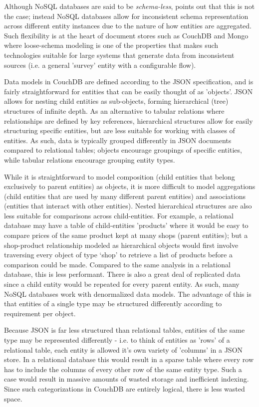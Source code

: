 Although NoSQL databases are said to be \textit{schema-less}, \cite{ATZENI2016} points out that this is not the case; instead NoSQL databases allow for inconsistent schema representation across different entity instances due to the nature of how entities are aggregated. Such flexibility is at the heart of document stores such as CouchDB and Mongo where loose-schema modeling is one of the properties that makes such technologies suitable for large systems that generate data from inconsistent sources (i.e. a general 'survey' entity with a configurable flow).

Data models in CouchDB are defined according to the JSON specification, and is fairly straightforward for entities that can be easily thought of as 'objects'. JSON allows for nesting child entities as sub-objects, forming hierarchical (tree) structures of infinite depth. As an alternative to tabular relations where relationships are defined by key references, hierarchical structures allow for easily structuring specific entities, but are less suitable for working with classes of entities. As such, data is typically grouped differently in JSON documents compared to relational tables; objects encourage groupings of specific entities, while tabular relations encourage grouping entity types.

While it is straightforward to model composition (child entities that belong exclusively to parent entities) as objects, it is more difficult to model aggregations (child entities that are used by many different parent entities) and associations (entities that interact with other entities). Nested hierarchical structures are also less suitable for comparisons across child-entities. For example, a relational database may have a table of child-entities 'products' where it would be easy to compare prices of the same product kept at many shops (parent entities); but a shop-product relationship modeled as hierarchical objects would first involve traversing every object of type `shop' to retrieve a list of products before a comparison could be made. Compared to the same analysis in a relational database, this is less performant. There is also a great deal of replicated data since a child entity would be repeated for every parent entity. As such, many NoSQL databases work with denormalized data models. The advantage of this is that entities of a single type may be structured differently according to requirement per object.

Because JSON is far less structured than relational tables, entities of the same type may be represented differently - i.e. to think of entities as 'rows' of a relational table, each entity is allowed it's own variety of 'columns' in a JSON store. In a relational database this would result in a sparse table where every row has to include the columns of every other row of the same entity type. Such a case would result in massive amounts of wasted storage and inefficient indexing. Since such categorizations in CouchDB are entirely logical, there is less wasted space.

